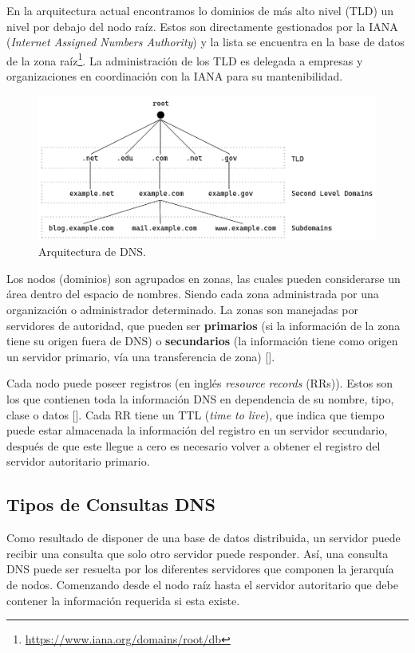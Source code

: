 En la arquitectura actual encontramos lo dominios de más alto nivel (TLD) un nivel por debajo del nodo raíz. Estos son directamente gestionados por la IANA (\textit{Internet Assigned Numbers Authority}) y la lista se encuentra en la base de datos de la zona raíz\footnote{\url{https://www.iana.org/domains/root/db}}. La administración de los TLD es delegada a empresas y organizaciones en coordinación con la IANA para su mantenibilidad.

\begin{figure}[!ht]
    \centering
    \includegraphics[width=\linewidth]{draws/dns-arch.png}
    \caption{Arquitectura de DNS.}
\end{figure}

Los nodos (dominios) son agrupados en zonas, las cuales pueden considerarse un área dentro del espacio de nombres. Siendo cada zona administrada por una organización o administrador determinado. La zonas son manejadas por servidores de autoridad, que pueden ser \textbf{primarios} (si la información de la zona tiene su origen fuera de DNS) o \textbf{secundarios} (la información tiene como origen un servidor primario, vía una transferencia de zona) [\cite{Vixie_2007}].

Cada nodo puede poseer registros (en inglés \textit{resource records} (RRs)). Estos son los que contienen toda la información DNS en dependencia de su nombre, tipo, clase o datos [\cite{rfc_1035}]. Cada RR tiene un TTL (\textit{time to live}), que indica que tiempo puede estar almacenada la información del registro en un servidor secundario, después de que este llegue a cero es necesario volver a obtener el registro del servidor autoritario primario.

\subsection{Tipos de Consultas DNS}

Como resultado de disponer de una base de datos distribuida, un servidor puede recibir una consulta que solo otro servidor puede responder. Así, una consulta DNS puede ser resuelta por los diferentes servidores que componen la jerarquía de nodos. Comenzando desde el nodo raíz hasta el servidor autoritario que debe contener la información requerida si esta existe.

